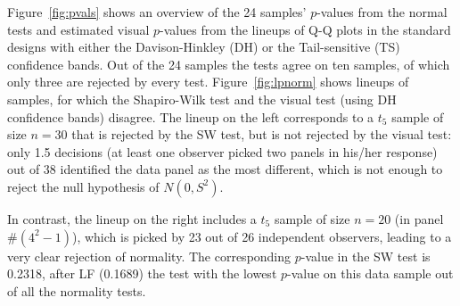 \documentclass{article}\usepackage[]{graphicx}\usepackage[]{color}
\begin{document}
Figure~\ref{fig:pvals} shows an overview of the 24 samples' $p$-values  from the normal tests and estimated visual $p$-values from the lineups of Q-Q plots in the standard designs with either the Davison-Hinkley (DH) or the Tail-sensitive (TS) confidence bands. Out of the 24 samples the tests agree on ten samples, of which only three are rejected by every test.
Figure~\ref{fig:lpnorm} shows lineups of samples, for which the Shapiro-Wilk test and the visual test (using DH confidence bands) disagree. 
The lineup on the left corresponds to a $t_5$ sample of size $n = 30$ that is rejected by the SW test, but is not rejected by the visual test: only 1.5 decisions (at least one observer picked two panels in his/her response) out of 38 identified the data panel as the most different, which is not enough to reject the null hypothesis of $N(0, S^2)$. 

In contrast, the  lineup  on the right includes a $t_5$ sample of size $n=20$ (in panel \#$(4^2-1)$), which is picked by 23 out of 26 independent observers, leading to a very clear rejection of normality. 
The corresponding $p$-value in the SW test is 0.2318, after LF (0.1689) the test with the lowest $p$-value on this data sample out of all the normality tests.
\end{document}
